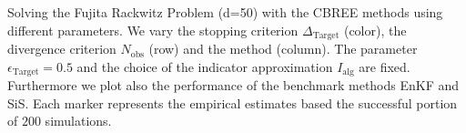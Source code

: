 Solving the Fujita Rackwitz Problem (d=50) with the CBREE methods using      different parameters.     We vary the stopping criterion $\Delta_{\text{Target}}$ (color),     the divergence criterion $N_\text{obs}$ (row) and     the method  (column).     The parameter $\epsilon_{\text{Target}} = 0.5$     and the choice of the indicator approximation $I_\text{alg}$     are fixed.     Furthermore we plot also the performance of the benchmark methods EnKF     and SiS.     Each marker represents the empirical estimates based the successful portion of $200$ simulations.